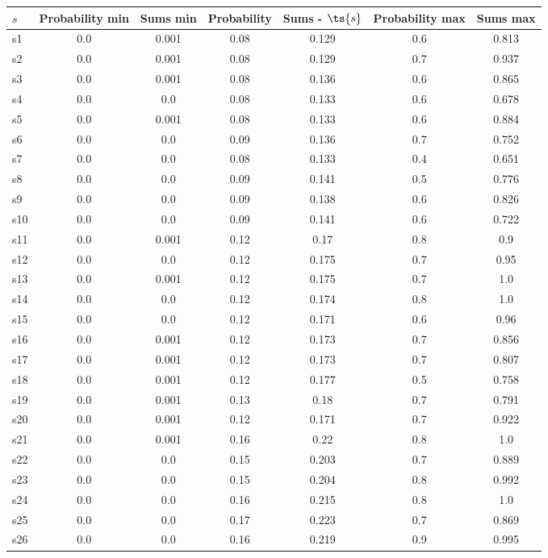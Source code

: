 \documentclass{article}
\begin{document}
\noindent\begin{tabular}{|l|c|c|c|c|c|c|}
\hline
$s$& Probability min & Sums min & Probability & Sums - $\ts{s}$ & Probability max & Sums max\\
\hline
s1 &0.0 & 0.001 & 0.08 & 0.129 & 0.6 & 0.813\\
\hline
s2 &0.0 & 0.001 & 0.08 & 0.129 & 0.7 & 0.937\\
\hline
s3 &0.0 & 0.001 & 0.08 & 0.136 & 0.6 & 0.865\\
\hline
s4 &0.0 & 0.0 & 0.08 & 0.133 & 0.6 & 0.678\\
\hline
s5 &0.0 & 0.001 & 0.08 & 0.133 & 0.6 & 0.884\\
\hline
s6 &0.0 & 0.0 & 0.09 & 0.136 & 0.7 & 0.752\\
\hline
s7 &0.0 & 0.0 & 0.08 & 0.133 & 0.4 & 0.651\\
\hline
s8 &0.0 & 0.0 & 0.09 & 0.141 & 0.5 & 0.776\\
\hline
s9 &0.0 & 0.0 & 0.09 & 0.138 & 0.6 & 0.826\\
\hline
s10 &0.0 & 0.0 & 0.09 & 0.141 & 0.6 & 0.722\\
\hline
s11 &0.0 & 0.001 & 0.12 & 0.17 & 0.8 & 0.9\\
\hline
s12 &0.0 & 0.0 & 0.12 & 0.175 & 0.7 & 0.95\\
\hline
s13 &0.0 & 0.001 & 0.12 & 0.175 & 0.7 & 1.0\\
\hline
s14 &0.0 & 0.0 & 0.12 & 0.174 & 0.8 & 1.0\\
\hline
s15 &0.0 & 0.0 & 0.12 & 0.171 & 0.6 & 0.96\\
\hline
s16 &0.0 & 0.001 & 0.12 & 0.173 & 0.7 & 0.856\\
\hline
s17 &0.0 & 0.001 & 0.12 & 0.173 & 0.7 & 0.807\\
\hline
s18 &0.0 & 0.001 & 0.12 & 0.177 & 0.5 & 0.758\\
\hline
s19 &0.0 & 0.001 & 0.13 & 0.18 & 0.7 & 0.791\\
\hline
s20 &0.0 & 0.001 & 0.12 & 0.171 & 0.7 & 0.922\\
\hline
s21 &0.0 & 0.001 & 0.16 & 0.22 & 0.8 & 1.0\\
\hline
s22 &0.0 & 0.0 & 0.15 & 0.203 & 0.7 & 0.889\\
\hline
s23 &0.0 & 0.0 & 0.15 & 0.204 & 0.8 & 0.992\\
\hline
s24 &0.0 & 0.0 & 0.16 & 0.215 & 0.8 & 1.0\\
\hline
s25 &0.0 & 0.0 & 0.17 & 0.223 & 0.7 & 0.869\\
\hline
s26 &0.0 & 0.0 & 0.16 & 0.219 & 0.9 & 0.995\\

\end{tabular}
\end{document}
